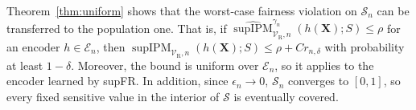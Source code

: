 \documentclass{article} %
\begin{document}
Theorem~\ref{thm:uniform} shows that the worst-case fairness violation on $\mathcal{S}_n$ can be transferred to the population
one. That is, if $\widehat{\operatorname{supIPM}}^{\gamma_n}_{\mathcal{V}_{\mathrm{R}},n}(h(\mathbf{X});S)\le\rho$ for an encoder $h\in\mathcal{E}_n$, then $\operatorname{supIPM}_{\mathcal{V}_{\mathrm{R}},n}(h(\mathbf{X});S)\le\rho+Cr_{n,\delta}$ with probability at least $1-\delta$.  
Moreover, the bound is uniform over $\mathcal{E}_n$, so it applies to the encoder learned by supFR.
In addition, since $\epsilon_n \to 0$, $\mathcal{S}_n$ converges to $[0,1]$, so every fixed sensitive value in the interior of $\mathcal{S}$ is eventually covered.
\end{document}
